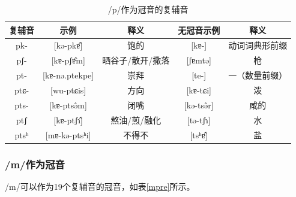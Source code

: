 \begin{table}[H]
\vspace{5pt}
    \centering
    \caption{/p/作为冠音的复辅音}
    \label{ppre}
\begin{tabular}{c|cccc}
     \toprule
复辅音   & 示例              & 释义   & 无冠音示例          & 释义        \\
     \midrule
	pk-  & {[}kə-pkɐ̂{]}      & 饱的        & {[}kɐ-{]}      & 动词词典形前缀 \\
pʃ-  & {[}kɐ-pʃɐ̂m{]}     & 晒谷子/散开/撒落 & {[}ʃɐmtə{]}    & 枪       \\
pt-  & {[}kɐ-nə.ptekpe{]} & 崇拜        & {[}te-{]}      & 一（数量前缀） \\
ptɕ- & {[}wu-ptɕis{]}     & 方向        & {[}kɐ-tɕi{]}   & 泼       \\
pts- & {[}kɐ-ptsə̂m{]}    & 闭嘴        & {[}kə-tsə̂r{]} & 咸的      \\
ptʃ  & {[}kɐ-ptʃɿ̂{]}     & 熬油/煎/融化   & {[}tə-tʃɿ{]}   & 水       \\
ptsʰ & {[}mɐ-kə-ptsʰi{]}  & 不得不       & {[}tsʰɐ̂{]}    & 盐      \\ 
   \bottomrule
\end{tabular}
\end{table}

\subsubsection{/m/作为冠音}

/m/可以作为19个复辅音的冠音，如表\ref{mpre}所示。

